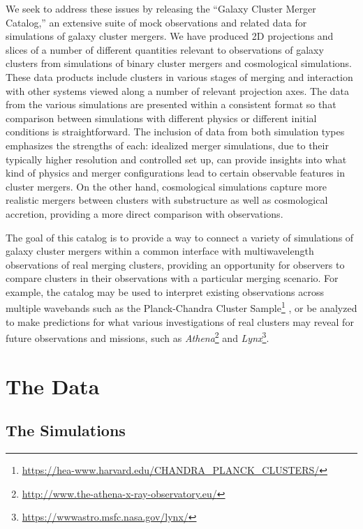 \documentclass{emulateapj}
\begin{document}
We seek to address these issues by releasing the ``Galaxy Cluster Merger Catalog,'' an extensive suite of mock observations and related data for simulations of galaxy cluster mergers. We have produced 2D projections and slices of a number of different quantities relevant to observations of galaxy clusters from simulations of binary cluster mergers and cosmological simulations. These data products include clusters in various stages of merging and interaction with other systems viewed along a number of relevant projection axes. The data from the various simulations are presented within a consistent format so that comparison between simulations with different physics or different initial conditions is straightforward. The inclusion of data from both simulation types emphasizes the strengths of each: idealized merger simulations, due to their typically higher resolution and controlled set up, can provide insights into what kind of physics and merger configurations lead to certain observable features in cluster mergers. On the other hand, cosmological simulations capture more realistic mergers between clusters with substructure as well as cosmological accretion, providing a more direct comparison with observations.

The goal of this catalog is to provide a way to connect a variety of simulations of galaxy cluster mergers within a common interface with multiwavelength observations of real merging clusters, providing an opportunity for observers to compare clusters in their observations with a particular merging scenario. For example, the catalog may be used to interpret existing observations across multiple wavebands such as the Planck-Chandra Cluster Sample\footnote{\url{https://hea-www.harvard.edu/CHANDRA_PLANCK_CLUSTERS/}} \citep{and17}, or be analyzed to make predictions for what various investigations of real clusters may reveal for future observations and missions, such as {\it Athena}\footnote{\url{http://www.the-athena-x-ray-observatory.eu/}} and {\it Lynx}\footnote{\url{https://wwwastro.msfc.nasa.gov/lynx/}}.

\section{The Data}

\subsection{The Simulations}
\end{document}
